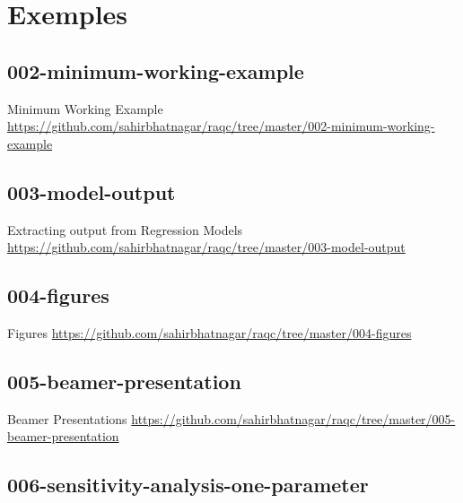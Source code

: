 \documentclass[10pt]{beamer}\usepackage[]{graphicx}\usepackage[]{color}
\begin{document}
\section{Exemples}

\subsection{002-minimum-working-example}

\begin{frame}{Minimum Working Example}
\href{https://github.com/sahirbhatnagar/raqc/tree/master/002-minimum-working-example}{https://github.com/sahirbhatnagar/raqc/tree/master/002-minimum-working-example}
\end{frame}


\subsection{003-model-output}

\begin{frame}{Extracting output from Regression Models}
\href{https://github.com/sahirbhatnagar/raqc/tree/master/003-model-output}{https://github.com/sahirbhatnagar/raqc/tree/master/003-model-output}
\end{frame}


\subsection{004-figures}

\begin{frame}{Figures}
\href{https://github.com/sahirbhatnagar/raqc/tree/master/004-figures}{https://github.com/sahirbhatnagar/raqc/tree/master/004-figures}
\end{frame}


\subsection{005-beamer-presentation}

\begin{frame}{Beamer Presentations}
\href{https://github.com/sahirbhatnagar/raqc/tree/master/005-beamer-presentation}{https://github.com/sahirbhatnagar/raqc/tree/master/005-beamer-presentation}
\end{frame}


\subsection{006-sensitivity-analysis-one-parameter}
\end{document}
